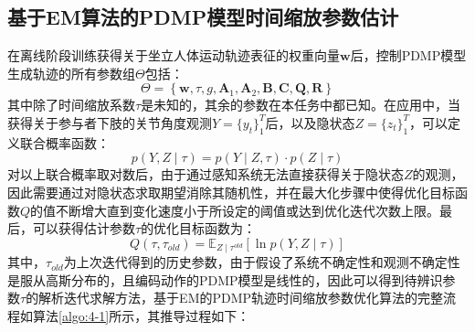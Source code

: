 \subsection{基于EM算法的PDMP模型时间缩放参数估计}
在离线阶段训练获得关于坐立人体运动轨迹表征的权重向量$\pmb{w}$后，控制PDMP模型生成轨迹的所有参数组$\Theta$包括：
\begin{equation}
    \Theta=\left\{\pmb{w}, \tau, g, \mathbf{A}_1, \mathbf{A}_2, \mathbf{B}, \mathbf{C}, \mathbf{Q}, \mathbf{R}\right\}
    \label{eq:4-16}
\end{equation}
其中除了时间缩放系数$\tau$是未知的，其余的参数在本任务中都已知。在应用中，当获得关于参与者下肢的关节角度观测$Y=\{ y_t\}_1^T$后，以及隐状态$Z=\{z_t\}_1^T$，可以定义联合概率函数：
\begin{equation}
    p(Y, Z \mid \tau) = 
    p(Y \mid  Z, \tau) \cdot p(Z \mid  \tau)
    \label{eq:4-17}
\end{equation}
对以上联合概率取对数后，由于通过感知系统无法直接获得关于隐状态$Z$的观测，因此需要通过对隐状态求取期望消除其随机性，并在最大化步骤中使得优化目标函数$Q$的值不断增大直到变化速度小于所设定的阈值或达到优化迭代次数上限。最后，可以获得估计参数$\tau$的优化目标函数为：
\begin{equation}
    Q\left(\tau, \tau_{old}\right)=\mathbb{E}_{Z \mid \tau^{old}}[\ln p(Y, Z \mid \tau)]
    \label{eq:4-18}
\end{equation}
其中，$\tau_{old}$为上次迭代得到的历史参数，由于假设了系统不确定性和观测不确定性是服从高斯分布的，且编码动作的PDMP模型是线性的，因此可以得到待辨识参数$\tau$的解析迭代求解方法，基于EM的PDMP轨迹时间缩放参数优化算法的完整流程如算法\ref{algo:4-1}所示，其推导过程如下：

